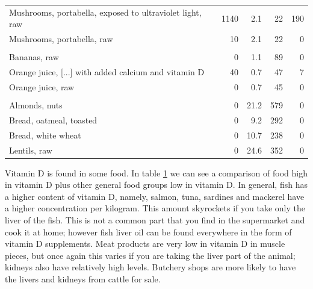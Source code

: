 \begin{table}[h!]
{\begin{tabular}{|lrrrr|}
		Mushrooms, portabella, exposed to ultraviolet light, raw                           & 1140               & 2.1         & 22            & 190   \\
		Mushrooms, portabella, raw                                                         & 10                 & 2.1         & 22            & 0     \\ \hline
		\rowcolor[HTML]{FFCE93} 
		\multicolumn{5}{|c|}{\cellcolor[HTML]{FFCE93}Fruit}                                                                                           \\ \hline
		Bananas, raw                                                                       & 0                  & 1.1         & 89            & 0     \\
		Orange juice, [...] with added calcium and vitamin D & 40                          & 0.7         & 47            & 7     \\
		Orange juice, raw                                                                  & 0                  & 0.7         & 45            & 0     \\ \hline
		\rowcolor[HTML]{FFFC9E} 
		\multicolumn{5}{|c|}{\cellcolor[HTML]{FFFC9E}Other}                                                                                           \\ \hline
		Almonds, nuts                                                                      & 0                  & 21.2        & 579           & 0     \\
		Bread, oatmeal, toasted                                                            & 0                  & 9.2         & 292           & 0     \\
		Bread, white wheat                                                                 & 0                  & 10.7        & 238           & 0     \\
		Lentils, raw                                                                       & 0                  & 24.6        & 352           & 0     \\ \hline
		
	\end{tabular}
	}
    \label{table:vitDSources}
	
\end{table}


Vitamin D is found in some food. In table \ref{table:vitDSources} we can see a comparison of food high in vitamin D plus other general food groups low in vitamin D. In general, fish has a higher content of vitamin D, namely, salmon, tuna, sardines and mackerel have a higher concentration per kilogram. This amount skyrockets if you take only the liver of the fish. This is not a common part that you find in the supermarket and cook it at home; however fish liver oil can be found everywhere in the form of vitamin D supplements. Meat products are very low in vitamin D in muscle pieces, but once again this varies if you are taking the liver part of the animal; kidneys also have relatively high levels. Butchery shops are more likely to have the livers and kidneys from cattle for sale.

